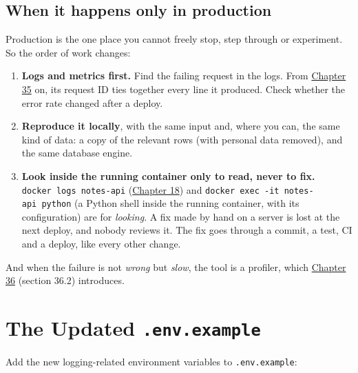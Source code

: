 \subsection*{When it happens only in production}\label{16-logging-error-handling:when-it-happens-only-in-production}

Production is the one place you cannot freely stop, step through or experiment. So the order of work changes:

\begin{enumerate}
\def\labelenumi{\arabic{enumi}.}
\tightlist
\item
  \textbf{Logs and metrics first.} Find the failing request in the logs. From \hyperref[ch:35-observability]{Chapter 35} on, its request ID ties together every line it produced. Check whether the error rate changed after a deploy.
\item
  \textbf{Reproduce it locally}, with the same input and, where you can, the same kind of data: a copy of the relevant rows (with personal data removed), and the same database engine.
\item
  \textbf{Look inside the running container only to read, never to fix.} \texttt{docker\ logs\ notes-api} (\hyperref[ch:18-containerization]{Chapter 18}) and \texttt{docker\ exec\ -}\allowbreak{}\texttt{it\ notes-}\allowbreak{}\texttt{api\ python} (a Python shell inside the running container, with its configuration) are for \emph{looking}. A fix made by hand on a server is lost at the next deploy, and nobody reviews it. The fix goes through a commit, a test, CI and a deploy, like every other change.
\end{enumerate}

\noindent{}And when the failure is not \emph{wrong} but \emph{slow}, the tool is a profiler, which \hyperref[ch:36-scaling-load]{Chapter 36} (section 36.2) introduces.

\setcounter{section}{10}
\section{\texorpdfstring{The Updated \texttt{.env.example}}{The Updated .env.example}}\label{16-logging-error-handling:1611-the-updated-envexample}

Add the new logging-related environment variables to \texttt{.env.example}:

